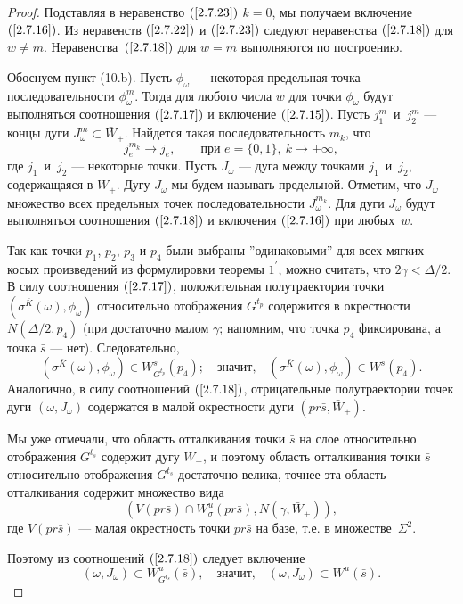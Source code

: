 \documentclass[12pt]{article}
\begin{document}
\begin{proof}
Подставляя в неравенство $(\ref{2.7.23})$ $k=0$, мы получаем включение $(\ref{2.7.16})$.
Из неравенств $(\ref{2.7.22})$ и $(\ref{2.7.23})$ следуют неравенства $(\ref{2.7.18})$ для $w\neq m$. Неравенства~$(\ref{2.7.18})$ для $w=m$ выполняются по построению.

Обоснуем пункт (10.b). Пусть $\phi_{\omega}$ --- некоторая предельная точка последовательности $\phi_{\omega}^m$. Тогда для любого числа $w$ для точки $\phi_{\omega}$ будут выполняться соотношения $(\ref{2.7.17})$ и включение $(\ref{2.7.15})$.
Пусть $j_1^m$~и~$j_2^m$ --- концы дуги $J^m_{\omega}\subset \bar{W}_+$. Найдется такая последовательность $m_k$, что 
$$j_e^{m_k}\longrightarrow j_e,\qquad\textrm{при }e=\{0,1\},\ k\rightarrow+\infty,$$
где $j_1$~и~$j_2$ --- некоторые точки. Пусть $J_{\omega}$ --- дуга между точками $j_1$~и~$j_2$, содержащаяся в $W_+$. Дугу $J_{\omega}$ мы будем называть предельной. Отметим, что $J_{\omega}$ --- множество всех предельных точек последовательности $J^{m_k}_{\omega}$. Для дуги $J_{\omega}$ будут выполняться соотношения $(\ref{2.7.18})$ и включения $(\ref{2.7.16})$ при любых~$w$. 
 
 Так как точки $p_1$, $p_2$, $p_3$ и $p_4$ были выбраны ''одинаковыми'' для всех мягких косых произведений из формулировки теоремы $\mbox{1}^{\prime}$, можно считать, %
что $2\gamma<\Delta/2$.
В силу соотношения $(\ref{2.7.17})$, положительная полутраектория точки $(\sigma^{\bar{K}}(\omega),\phi_{\omega})$ относительно отображения $G^{t_p}$ содержится в окрестности $N(\Delta/2,p_4)$ (при достаточно малом $\gamma$; напомним, что точка $p_4$ фиксирована, а точка $\bar{s}$ --- нет). Следовательно, 
$$(\sigma^{\bar{K}}(\omega),\phi_{\omega})\in W_{G^{t_p}}^s(p_4);\quad\textrm{значит,}\quad(\sigma^{\bar{K}}(\omega),\phi_{\omega})\in W^s(p_4).$$
 Аналогично, в силу соотношений $(\ref{2.7.18})$, отрицательные полутраектории точек дуги $(\omega,J_{\omega})$ содержатся в малой окрестности дуги $(pr\bar{s},\bar{W}_+)$.
 
Мы уже отмечали, что область отталкивания точки $\bar{s}$ на слое относительно отображения $G^{t_s}$ содержит дугу $W_+$, и поэтому область отталкивания точки $\bar{s}$ относительно отображения $G^{t_s}$ достаточно велика, точнее эта область отталкивания содержит множество вида
$$(V(pr\bar{s})\cap W_{\sigma}^u(pr\bar{s}),N(\gamma,\bar{W}_+)),$$
где $V(pr\bar{s})$ --- малая окрестность точки $pr\bar{s}$ на базе, т.е. в множестве~$\Sigma^2$.  

 Поэтому из соотношений $(\ref{2.7.18})$ следует включение
$$(\omega,J_{\omega})\subset W_{G^{t_s}}^u(\bar{s}),\quad\textrm{значит,}\quad
(\omega,J_{\omega})\subset W^u(\bar{s}).$$ 
\end{proof}
\end{document}
